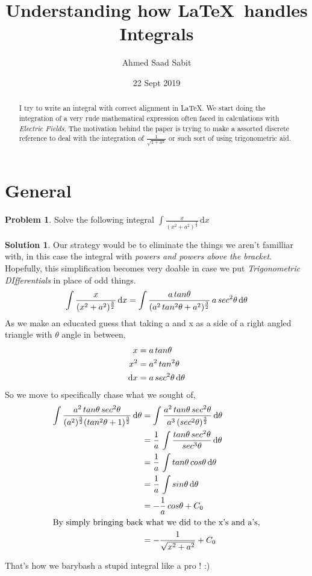 \documentclass{article}
\title{\textsf{Understanding how \LaTeX\  handles Integrals}}
\author{Ahmed Saad Sabit}
\date{22 Sept 2019}
\theoremstyle{definition}
\newtheorem{prob}{\textsf{Problem}}[section]
\theoremstyle{definition}
\newtheorem{sol}{\textsf{Solution}}[section]
\theoremstyle{definition}
\begin{document}
\maketitle
\begin{abstract}
I try to write an integral with correct alignment in \LaTeX. We start doing the integration of a very rude mathematical expression often faced in calculations with \emph{Electric Fields}. The motivation behind the paper is trying to make a assorted discrete reference to deal with the integration of $\frac{1}{\sqrt{1 + x^2}}$ or such sort of using trigonometric aid.
\end{abstract}
\section{General}
\theoremstyle{definition}
\begin{prob}
 Solve the following integral $\int\frac{x}{(x^2+a^2)^{\frac{3}{2}}}\, \mathrm{d}x  $
\end{prob}
\begin{sol}
Our strategy would be to eliminate the things we aren't familliar with, in this case the integral with \emph{powers and powers above the bracket}. Hopefully, this simplification becomes very doable in case we put \emph{Trigonometric DIfferentials} in place of odd things.
\begin{align}
\int\frac{x}{(x^2+a^2)^ {\frac{3}{2}}} \, \mathrm{d}x \notag = \int\frac{a\,tan\theta}{ (a^2\, tan^2\theta + a^2)^ {\frac{3}{2}} } \, a\, sec^2\theta \,\mathrm{d}\theta
\end{align}
As we make an educated guess that taking a and x as a side of a right angled triangle with $\theta$ angle in between,
\begin{align}
x & = a \, tan\theta  \notag \\
 x^2 & = a^2 \, tan^2\theta  \notag \\
 \mathrm{d}x& = a \,sec^2 \theta\, \mathrm{d}\theta \notag
\end{align}
So we move to specifically chase what we sought of,\\
\begin{align}
\int \frac{a^2 \, tan\theta \,sec^2\theta}
    		{ (a^2)^{\frac{3}{2}} (tan^2\theta + 1)^{\frac{3}{2}} } \, \mathrm{d}\theta	\notag 
&=\int \frac{a^2 \, tan\theta \,sec^2\theta}
			{a^3 \, (sec^2\theta)^ {\frac{3}{2}} }	\, \mathrm{d}\theta	\notag \\
&= \frac{1}{a} \, \int \frac{tan\theta \, sec^2\theta}
								{sec^3\theta} \,\mathrm{d}\theta		\notag \\
&= \frac{1}{a} \, \int tan\theta \, cos\theta 	\, \mathrm{d}\theta \notag \\
%
&=\frac{1}{a} \, \int sin\theta \, \mathrm{d}\theta \notag	\\
&= - \frac{1}{a} \, cos\theta + C_0 \\
\intertext{By simply bringing back what we did to the x's and a's,}
&= - \frac{1}{\sqrt{x^2 + a^2}} + C_0
\end{align}
\end{sol}
That's how we barybash a stupid integral like a pro ! :)\\
\end{document}
